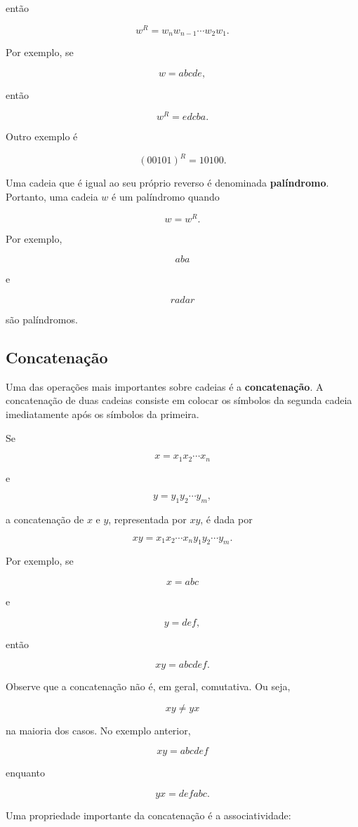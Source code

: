 \documentclass[
  brazilian,
  letterpaper,
]{book}
\theoremstyle{plain}
\theoremstyle{definition}
\theoremstyle{remark}
\begin{document}
então

\[
w^R=w_nw_{n-1}\cdots w_2w_1.
\]

Por exemplo, se

\[
w=abcde,
\]

então

\[
w^R=edcba.
\]

Outro exemplo é

\[
(00101)^R=10100.
\]

Uma cadeia que é igual ao seu próprio reverso é denominada
\textbf{palíndromo}. Portanto, uma cadeia \(w\) é um palíndromo quando

\[
w=w^R.
\]

Por exemplo,

\[
aba
\]

e

\[
radar
\]

são palíndromos.

\subsection{Concatenação}\label{concatenauxe7uxe3o}

Uma das operações mais importantes sobre cadeias é a
\textbf{concatenação}. A concatenação de duas cadeias consiste em
colocar os símbolos da segunda cadeia imediatamente após os símbolos da
primeira.

Se

\[
x=x_1x_2\cdots x_n
\]

e

\[
y=y_1y_2\cdots y_m,
\]

a concatenação de \(x\) e \(y\), representada por \(xy\), é dada por

\[
xy=x_1x_2\cdots x_ny_1y_2\cdots y_m.
\]

Por exemplo, se

\[
x=abc
\]

e

\[
y=def,
\]

então

\[
xy=abcdef.
\]

Observe que a concatenação não é, em geral, comutativa. Ou seja,

\[
xy\neq yx
\]

na maioria dos casos. No exemplo anterior,

\[
xy=abcdef
\]

enquanto

\[
yx=defabc.
\]

Uma propriedade importante da concatenação é a associatividade:
\end{document}
